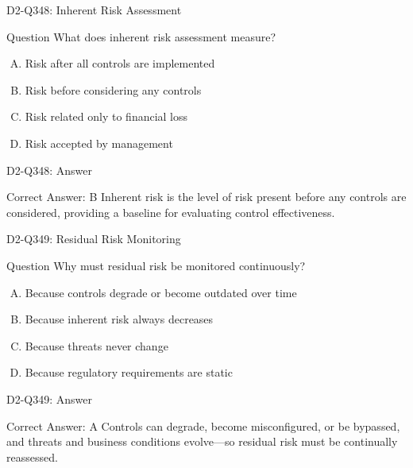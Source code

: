 \documentclass{beamer}
\begin{document}
\begin{frame}{D2-Q348: Inherent Risk Assessment}
	\begin{block}{Question}
		What does inherent risk assessment measure?
	\end{block}
	\begin{enumerate}[(A)]
		\item Risk after all controls are implemented
		\item Risk before considering any controls
		\item Risk related only to financial loss
		\item Risk accepted by management
	\end{enumerate}
\end{frame}
\begin{frame}{D2-Q348: Answer}
	\begin{block}{Correct Answer: B}
		Inherent risk is the level of risk present before any controls are considered, providing a baseline for evaluating control effectiveness.
	\end{block}
\end{frame}

\begin{frame}{D2-Q349: Residual Risk Monitoring}
	\begin{block}{Question}
		Why must residual risk be monitored continuously?
	\end{block}
	\begin{enumerate}[(A)]
		\item Because controls degrade or become outdated over time
		\item Because inherent risk always decreases
		\item Because threats never change
		\item Because regulatory requirements are static
	\end{enumerate}
\end{frame}
\begin{frame}{D2-Q349: Answer}
	\begin{block}{Correct Answer: A}
		Controls can degrade, become misconfigured, or be bypassed, and threats and business conditions evolve—so residual risk must be continually reassessed.
	\end{block}
\end{frame}
\end{document}
